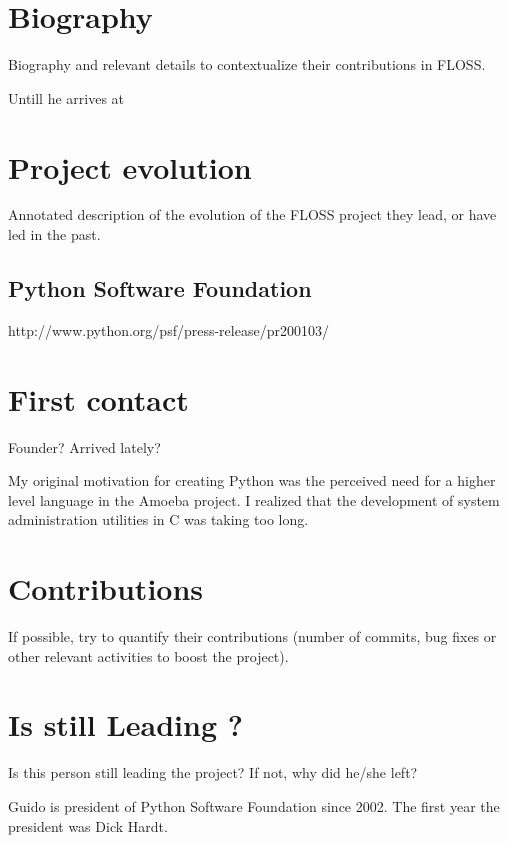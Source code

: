 \documentclass[11pt]{scrartcl}
\begin{document}
\section{Biography}

Biography and relevant details to contextualize their contributions in FLOSS.

Untill he arrives at %


\section{Project evolution}

Annotated description of the evolution of the FLOSS project they lead, or have led in the past.

\subsection{Python Software Foundation}

http://www.python.org/psf/press-release/pr200103/

\section{First contact}

Founder? Arrived lately?

My original motivation for creating Python was the perceived need for a higher level language in the Amoeba project. I realized that the development of system administration utilities in C was taking too long. 

\section{Contributions}

If possible, try to quantify their contributions (number of commits, bug fixes or other relevant activities to boost the project).

\section{Is still Leading ?}

Is this person still leading the project? If not, why did he/she left?

Guido is president of Python Software Foundation since 2002. The first year the president was Dick Hardt.
\end{document}

